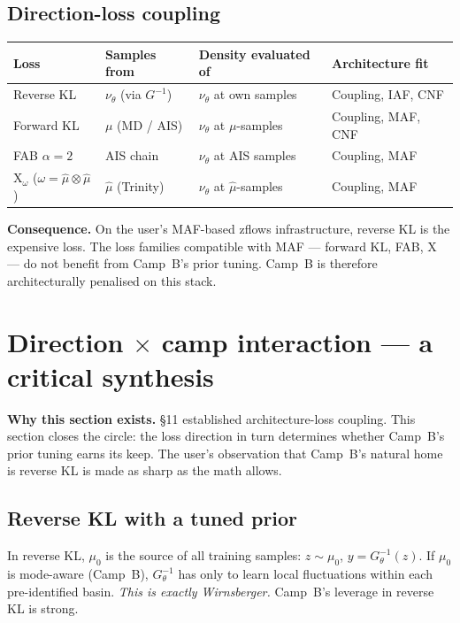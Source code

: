\documentclass[11pt,letterpaper]{article}
\newcommand{\Xfun}{\mathrm{X}}
\theoremstyle{plain}
\begin{document}
\subsection{Direction-loss coupling}

\begin{longtable}{@{}lp{4cm}p{4cm}p{3.5cm}@{}}
\toprule
Loss & Samples from & Density evaluated of & Architecture fit\\
\midrule\endhead
Reverse KL & $\nu_\theta$ (via $G^{-1}$) & $\nu_\theta$ at own samples & Coupling, IAF, CNF\\
Forward KL & $\mu$ (MD / AIS) & $\nu_\theta$ at $\mu$-samples & Coupling, MAF, CNF\\
FAB $\alpha=2$ & AIS chain & $\nu_\theta$ at AIS samples & Coupling, MAF\\
$\Xfun_\omega$ ($\omega=\hat\mu\otimes\hat\mu$) & $\hat\mu$ (Trinity) & $\nu_\theta$ at $\hat\mu$-samples & Coupling, MAF\\
\bottomrule
\end{longtable}

\textbf{Consequence.} On the user's MAF-based zflows infrastructure, reverse KL
is the expensive loss. The loss families compatible with MAF --- forward KL, FAB,
$\Xfun$ --- do not benefit from Camp~B's prior tuning. Camp~B is therefore
architecturally penalised on this stack.

\section{Direction $\times$ camp interaction --- a critical synthesis}

\begin{callout}
\textbf{Why this section exists.} \S11 established architecture-loss coupling.
This section closes the circle: the loss direction in turn determines whether
Camp~B's prior tuning earns its keep. The user's observation that Camp~B's
natural home is reverse KL is made as sharp as the math allows.
\end{callout}

\subsection{Reverse KL with a tuned prior}

In reverse KL, $\mu_0$ is the source of all training samples: $z\sim\mu_0$,
$y=G^{-1}_\theta(z)$. If $\mu_0$ is mode-aware (Camp~B), $G^{-1}_\theta$ has only
to learn local fluctuations within each pre-identified basin. \emph{This is
exactly Wirnsberger.} Camp~B's leverage in reverse KL is strong.
\end{document}
